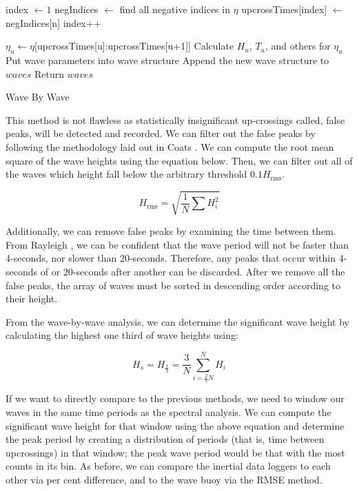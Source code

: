 \begin{algorithm}
    \begin{algorithmic}[1]
        \State index $\longleftarrow 1$
        \State negIndices $\longleftarrow$ find all negative indices in $\eta$ 
                \State upcrossTimes[index] $\longleftarrow$ negIndices[n]
                \State index++
            \EndIf
        \EndFor

            \State $\eta_u \longleftarrow \eta$[upcrossTimes[u]:upcrossTimes[u+1]]
            \State Calculate $H_u$, $T_u$, and others for $\eta_u$
            \State Put wave parameters into wave structure
            \State Append the new wave structure to $waves$
        \EndFor
        \State Return $waves$
        \EndFunction
    \end{algorithmic}
    \caption{Wave By Wave}\label{alg:wave_by_wave}
\end{algorithm}

This method is not flawless as statistically insignificant up-crossings called, false peaks, will be detected and recorded. 
We can filter out the false peaks by following the methodology laid out in Coats \cite{Coats:2013}. 
We can compute the root mean square of the wave heights using the equation below. 
Then, we can filter out all of the waves which height fall below the arbitrary threshold $0.1H_{\text{rms}}$.

\begin{equation}
    H_{\text{rms}} = \sqrt{\frac{1}{N} \sum{H_i^2}}
\end{equation}

Additionally, we can remove false peaks by examining the time between them. 
From Rayleigh \cite{DeanAndDalrymple}, we can be confident that the wave period will not be faster than 4-seconds, nor slower than 20-seconds. 
Therefore, any peaks that occur within 4-seconds of or 20-seconds after another can be discarded. 
After we remove all the false peaks, the array of waves must be sorted in descending order according to their height.

From the wave-by-wave analysis, we can determine the significant wave height by calculating the highest one third of wave heights using:

\begin{equation}
    H_s = H_{\frac{1}{3}} = \frac{3}{N} \sum_{i=\frac{2}{3}N}^N H_i
\end{equation}

If we want to directly compare to the previous methods, we need to window our waves in the same time periods as the spectral analysis. 
We can compute the significant wave height for that window using the above equation and determine the peak period by creating a distribution of periods (that is, time between upcrossings) in that window; the peak wave period would be that with the most counts in its bin. 
As before, we can compare the inertial data loggers to each other via per cent difference, and to the wave buoy via the RMSE method.